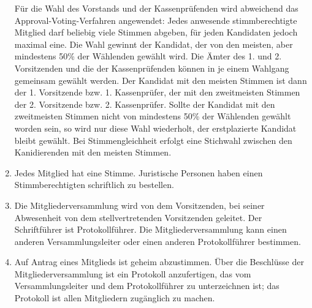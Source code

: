 \documentclass[11pt,DIV12]{scrartcl}
\begin{document}
\begin{enumerate}
Für die Wahl des Vorstands und der Kassenprüfenden wird abweichend das Approval-Voting-Verfahren angewendet:
Jedes anwesende stimmberechtigte Mitglied darf beliebig viele Stimmen abgeben, für jeden Kandidaten jedoch maximal eine.
Die Wahl gewinnt der Kandidat, der von den meisten, aber mindestens 50\% der Wählenden gewählt wird.
Die Ämter des 1. und 2. Vorsitzenden und die der Kassenprüfenden können in je einem Wahlgang gemeinsam gewählt werden.
Der Kandidat mit den meisten Stimmen ist dann der 1. Vorsitzende bzw. 1. Kassenprüfer, der mit den zweitmeisten Stimmen der 2. Vorsitzende bzw. 2. Kassenprüfer.
Sollte der Kandidat mit den zweitmeisten Stimmen nicht von mindestens 50\% der Wählenden gewählt worden sein, so wird nur diese Wahl wiederholt, der erstplazierte Kandidat bleibt gewählt.
Bei Stimmengleichheit erfolgt eine Stichwahl zwischen den Kanidierenden mit den meisten Stimmen.
\item Jedes Mitglied hat eine Stimme. Juristische Personen haben einen Stimmberechtigten schriftlich zu bestellen.
\item Die Mitgliederversammlung wird von dem Vorsitzenden, bei seiner Abwesenheit von dem stellvertretenden Vorsitzenden geleitet. Der Schriftführer ist Protokollführer. Die Mitgliederversammlung kann einen anderen Versammlungsleiter oder einen anderen Protokollführer bestimmen.
\item Auf Antrag eines Mitglieds ist geheim abzustimmen. Über die Beschlüsse der Mitgliederversammlung ist ein Protokoll anzufertigen, das vom Versammlungsleiter und dem Protokollführer zu unterzeichnen ist; das Protokoll ist allen Mitgliedern zugänglich zu machen.
\end{enumerate}
\end{document}
